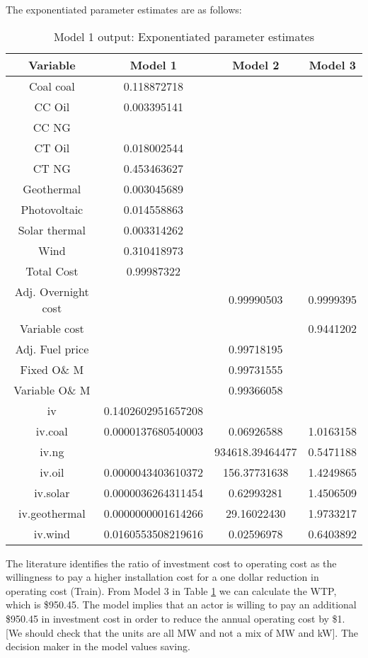\documentclass[10pt]{amsart}
\begin{document}
The exponentiated parameter estimates are as follows:
\begin{table}[H]
\caption{Model 1 output: Exponentiated parameter estimates}
\centering
\begin{tabular}{c c c c}
\hline
\hline
Variable & Model 1 & Model 2 & Model 3\\ [0.5ex]
\hline
Coal coal & 0.118872718 & & \\ 
CC Oil & 0.003395141 & &  \\
CC NG & & & \\
CT Oil & 0.018002544 & & \\
CT NG & 0.453463627 & &  \\
Geothermal & 0.003045689 & &  \\
Photovoltaic & 0.014558863 & &  \\
Solar thermal & 0.003314262 & & \\
Wind & 0.310418973 & &  \\
Total Cost & 0.99987322 & & \\
Adj. Overnight cost & & 0.99990503 & 0.9999395\\
Variable cost & & & 0.9441202 \\
Adj. Fuel price & & 0.99718195 &\\
Fixed O\& M & & 0.99731555 &\\
Variable O\& M & & 0.99366058 &\\
iv & 0.1402602951657208 & & \\
iv.coal & 0.0000137680540003 & 0.06926588 & 1.0163158 \\
iv.ng &  & 934618.39464477 & 0.5471188\\
iv.oil & 0.0000043403610372 & 156.37731638 & 1.4249865\\
iv.solar & 0.0000036264311454 & 0.62993281 & 1.4506509\\
iv.geothermal & 0.0000000001614266 & 29.16022430 & 1.9733217\\
iv.wind & 0.0160553508219616 & 0.02596978 & 0.6403892 \\ [1ex]
\hline
\end{tabular}
\label{exponentiated}
\end{table}

The literature identifies the ratio of investment cost to operating cost as the willingness to pay a higher installation cost for a one dollar reduction in operating cost \parencite{}(Train).
From Model 3 in Table \ref{exponentiated} we can calculate the WTP, which is \$950.45.
The model implies that an actor is willing to pay an additional \$950.45 in investment cost in order to reduce the annual operating cost by \$1. 
[We should check that the units are all MW and not a mix of MW and kW].  
The decision maker in the model values saving. 
\end{document}
